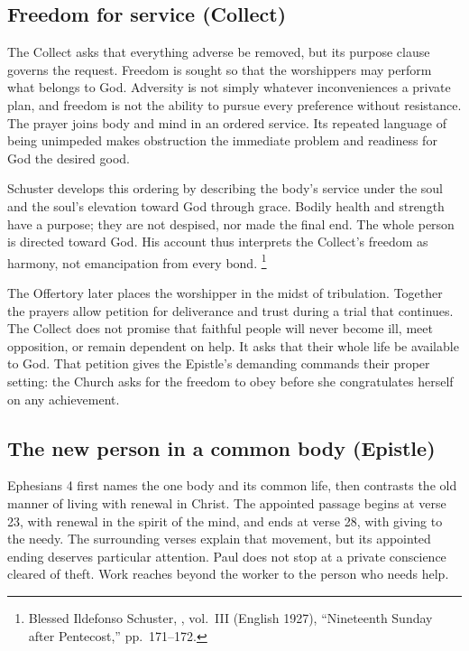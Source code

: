 \subsection{Freedom for service (Collect)}

The Collect asks that everything adverse be removed, but its purpose clause
governs the request. Freedom is sought so that the worshippers may perform
what belongs to God. Adversity is not simply whatever inconveniences a
private plan, and freedom is not the ability to pursue every preference
without resistance. The prayer joins body and mind in an ordered service.
Its repeated language of being unimpeded makes obstruction the immediate
problem and readiness for God the desired good.

Schuster develops this ordering by describing the body's service under the
soul and the soul's elevation toward God through grace. Bodily health and
strength have a purpose; they are not despised, nor made the final end.
The whole person is directed toward God. His account thus interprets the
Collect's freedom as harmony, not emancipation from every bond.
\footnote{Blessed Ildefonso Schuster, , vol.~III
(English 1927), ``Nineteenth Sunday after Pentecost,'' pp.~171--172.}

The Offertory later places the worshipper in the midst of tribulation.
Together the prayers allow petition for deliverance and trust during a trial
that continues. The Collect does not promise that faithful people will never
become ill, meet opposition, or remain dependent on help. It asks that their
whole life be available to God. That petition gives the Epistle's demanding
commands their proper setting: the Church asks for the freedom to obey
before she congratulates herself on any achievement.

\subsection{The new person in a common body (Epistle)}

Ephesians 4 first names the one body and its common life, then contrasts
the old manner of living with renewal in Christ. The appointed passage
begins at verse 23, with renewal in the spirit of the mind, and ends at
verse 28, with giving to the needy. The surrounding verses explain that
movement, but its appointed ending deserves particular attention. Paul
does not stop at a private conscience cleared of theft. Work reaches
beyond the worker to the person who needs help.

